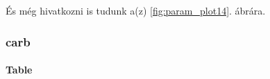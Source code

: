\documentclass[
]{article}
\begin{document}
És még hivatkozni is tudunk a(z) \ref{fig:param_plot14}. ábrára.

\hypertarget{carb}{%
\subsubsection{carb}\label{carb}}

\hypertarget{table-2}{%
\paragraph{Table}\label{table-2}}

 
  \providecommand{\huxb}[2]{\arrayrulecolor[RGB]{#1}\global\arrayrulewidth=#2pt}
  \providecommand{\huxvb}[2]{\color[RGB]{#1}\vrule width #2pt}
  \providecommand{\huxtpad}[1]{\rule{0pt}{#1}}
  \providecommand{\huxbpad}[1]{\rule[-#1]{0pt}{#1}}
\end{document}
